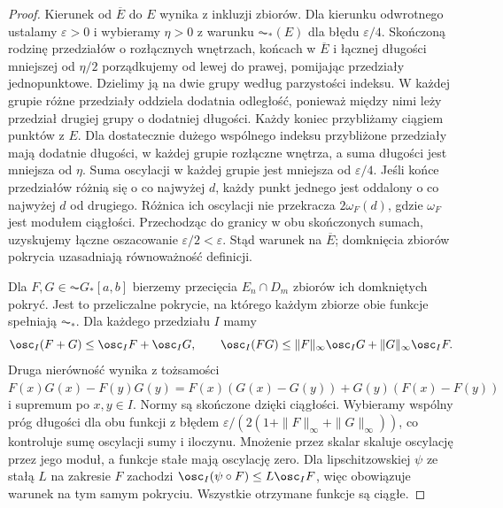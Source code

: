 \begin{proof}
Kierunek od $\overline E$ do $E$ wynika z inkluzji zbiorów.
Dla kierunku odwrotnego ustalamy $\varepsilon>0$ i wybieramy $\eta>0$ z warunku $\AC_*(E)$ dla błędu $\varepsilon/4$.
Skończoną rodzinę przedziałów o rozłącznych wnętrzach, końcach w $\overline E$ i łącznej długości mniejszej od $\eta/2$ porządkujemy od lewej do prawej, pomijając przedziały jednopunktowe.
Dzielimy ją na dwie grupy według parzystości indeksu. W każdej grupie różne przedziały oddziela dodatnia odległość, ponieważ między nimi leży przedział drugiej grupy o dodatniej długości.
Każdy koniec przybliżamy ciągiem punktów z $E$. Dla dostatecznie dużego wspólnego indeksu przybliżone przedziały mają dodatnie długości, w każdej grupie rozłączne wnętrza, a suma długości jest mniejsza od $\eta$. Suma oscylacji w każdej grupie jest mniejsza od $\varepsilon/4$.
Jeśli końce przedziałów różnią się o co najwyżej $d$, każdy punkt jednego jest oddalony o co najwyżej $d$ od drugiego. Różnica ich oscylacji nie przekracza $2\omega_F(d)$, gdzie $\omega_F$ jest modułem ciągłości. Przechodząc do granicy w obu skończonych sumach, uzyskujemy łączne oszacowanie $\varepsilon/2<\varepsilon$.
Stąd warunek na $\overline E$; domknięcia zbiorów pokrycia uzasadniają równoważność definicji.

Dla $F,G\in\AC G_*[a,b]$ bierzemy przecięcia $E_n\cap D_m$ zbiorów ich domkniętych pokryć. Jest to przeliczalne pokrycie, na którego każdym zbiorze obie funkcje spełniają $\AC_*$. Dla każdego przedziału $I$ mamy
\[
 \osc_I(F+G)\le\osc_I F+\osc_I G,\qquad
 \osc_I(FG)\le\|F\|_\infty\osc_I G+\|G\|_\infty\osc_I F.
\]
Druga nierówność wynika z tożsamości
$F(x)G(x)-F(y)G(y)=F(x)(G(x)-G(y))+G(y)(F(x)-F(y))$ i supremum po $x,y\in I$.
Normy są skończone dzięki ciągłości. Wybieramy wspólny próg długości dla obu funkcji z błędem $\varepsilon/(2(1+\|F\|_\infty+\|G\|_\infty))$, co kontroluje sumę oscylacji sumy i iloczynu. Mnożenie przez skalar skaluje oscylację przez jego moduł, a funkcje stałe mają oscylację zero.
Dla lipschitzowskiej $\psi$ ze stałą $L$ na zakresie $F$ zachodzi $\osc_I(\psi\circ F)\le L\osc_I F$, więc obowiązuje warunek na tym samym pokryciu. Wszystkie otrzymane funkcje są ciągłe.
\end{proof}

